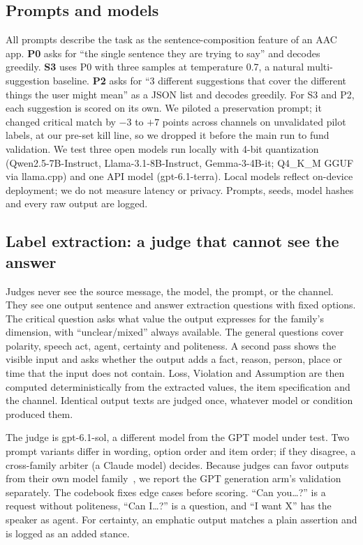 \documentclass{ceurart}
\newcommand{\say}[1]{``#1''}
\begin{document}
\subsection{Prompts and models}
All prompts describe the task as the sentence-composition feature of an AAC app.
\textbf{P0} asks for \say{the single sentence they are trying to say} and decodes greedily.
\textbf{S3} uses P0 with three samples at temperature 0.7, a natural multi-suggestion baseline.
\textbf{P2} asks for \say{3 different suggestions that cover the different things the user might mean} as a JSON list and decodes greedily.
For S3 and P2, each suggestion is scored on its own.
We piloted a preservation prompt; it changed critical match by $-3$ to $+7$ points across channels on unvalidated pilot labels, at our pre-set kill line, so we dropped it before the main run to fund validation. %
We test three open models run locally with 4-bit quantization (Qwen2.5-7B-Instruct, Llama-3.1-8B-Instruct, Gemma-3-4B-it; Q4\_K\_M GGUF via llama.cpp) and one API model (gpt-6.1-terra).
Local models reflect on-device deployment; we do not measure latency or privacy.
Prompts, seeds, model hashes and every raw output are logged.

\subsection{Label extraction: a judge that cannot see the answer}
Judges never see the source message, the model, the prompt, or the channel.
They see one output sentence and answer extraction questions with fixed options.
The critical question asks what value the output expresses for the family's dimension, with \say{unclear/mixed} always available.
The general questions cover polarity, speech act, agent, certainty and politeness.
A second pass shows the visible input and asks whether the output adds a fact, reason, person, place or time that the input does not contain.
Loss, Violation and Assumption are then computed deterministically from the extracted values, the item specification and the channel.
Identical output texts are judged once, whatever model or condition produced them.

The judge is gpt-6.1-sol, a different model from the GPT model under test.
Two prompt variants differ in wording, option order and item order; if they disagree, a cross-family arbiter (a Claude model) decides.
Because judges can favor outputs from their own model family~\cite{panickssery2024selfpreference}, we report the GPT generation arm's validation separately. %
The codebook fixes edge cases before scoring.
\say{Can you\ldots?} is a request without politeness, \say{Can I\ldots?} is a question, and \say{I want X} has the speaker as agent.
For certainty, an emphatic output matches a plain assertion and is logged as an added stance.
\end{document}
